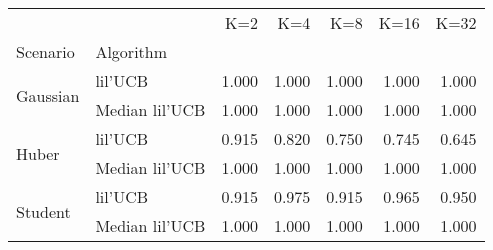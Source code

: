 \begin{tabular}{llrrrrr}
\toprule
        &                &    K=2 &    K=4 &    K=8 &   K=16 &   K=32 \\
Scenario & Algorithm &        &        &        &        &        \\
\midrule
\multirow{2}{*}{Gaussian} & lil'UCB &  1.000 &  1.000 &  1.000 &  1.000 &  1.000 \\
        & Median lil'UCB &  1.000 &  1.000 &  1.000 &  1.000 &  1.000 \\
\cline{1-7}
\multirow{2}{*}{Huber} & lil'UCB &  0.915 &  0.820 &  0.750 &  0.745 &  0.645 \\
        & Median lil'UCB &  1.000 &  1.000 &  1.000 &  1.000 &  1.000 \\
\cline{1-7}
\multirow{2}{*}{Student} & lil'UCB &  0.915 &  0.975 &  0.915 &  0.965 &  0.950 \\
        & Median lil'UCB &  1.000 &  1.000 &  1.000 &  1.000 &  1.000 \\
\bottomrule
\end{tabular}
